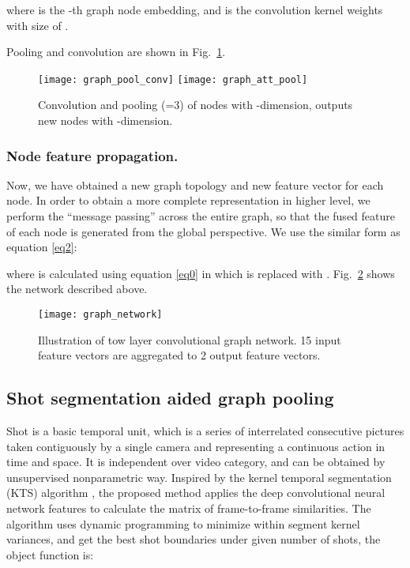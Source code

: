 \documentclass[runningheads]{llncs}
\begin{document}
where  is the -th graph node embedding, and  is the convolution kernel weights with size of . 

Pooling and convolution are shown in Fig.~\ref{fig:graph_pool_conv}.
\begin{figure}
\centering
\texttt{[image: graph\_pool\_conv]}
\texttt{[image: graph\_att\_pool]}
\caption{Convolution and pooling (=3) of  nodes with -dimension, outputs new  nodes with -dimension.}
\label{fig:graph_pool_conv}
\end{figure}

\subsubsection{Node feature propagation.}
Now, we have obtained a new graph topology and new feature vector for each node. In order to obtain a more complete representation in higher level, we perform the “message passing” across the entire graph, so that the fused feature of each node is generated from the global perspective. We use the similar form as equation \ref{eq2}:


where  is calculated using equation \ref{eq0} in which  is replaced with .
Fig.~\ref{fig:graph_network}  shows the network described above.

\begin{figure}
\centering
\texttt{[image: graph\_network]}
\caption{Illustration of tow layer convolutional graph network. 15 input feature vectors are aggregated to 2 output feature vectors.}
\label{fig:graph_network}
\end{figure}

\subsection{Shot segmentation aided graph pooling}

Shot is a basic temporal unit, which is a series of interrelated consecutive pictures taken contiguously by a single camera and representing a continuous action in time and space. It is independent over video category, and can be obtained by unsupervised nonparametric way. Inspired by the kernel temporal segmentation (KTS) algorithm \cite{potapov2014category}, the proposed method applies the deep convolutional neural network features to calculate the matrix of frame-to-frame similarities. The algorithm uses dynamic programming to minimize within segment kernel variances, and get the best shot boundaries under given number of shots, the object function is:
\end{document}
